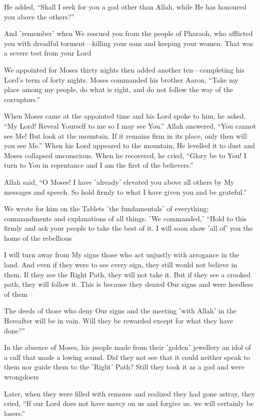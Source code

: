 He added, “Shall I seek for you a god other than Allah, while He has honoured you above the others?”

And ˹remember˺ when We rescued you from the people of Pharaoh, who afflicted you with dreadful torment—killing your sons and keeping your women. That was a severe test from your Lord

We appointed for Moses thirty nights then added another ten—completing his Lord’s term of forty nights. Moses commanded his brother Aaron, “Take my place among my people, do what is right, and do not follow the way of the corruptors.”

When Moses came at the appointed time and his Lord spoke to him, he asked, “My Lord! Reveal Yourself to me so I may see You.” Allah answered, “You cannot see Me! But look at the mountain. If it remains firm in its place, only then will you see Me.” When his Lord appeared to the mountain, He levelled it to dust and Moses collapsed unconscious. When he recovered, he cried, “Glory be to You! I turn to You in repentance and I am the first of the believers.”

Allah said, “O Moses! I have ˹already˺ elevated you above all others by My messages and speech. So hold firmly to what I have given you and be grateful.”

We wrote for him on the Tablets ˹the fundamentals˺ of everything; commandments and explanations of all things. ˹We commanded,˺ “Hold to this firmly and ask your people to take the best of it. I will soon show ˹all of˺ you the home of the rebellious

I will turn away from My signs those who act unjustly with arrogance in the land. And even if they were to see every sign, they still would not believe in them. If they see the Right Path, they will not take it. But if they see a crooked path, they will follow it. This is because they denied Our signs and were heedless of them

The deeds of those who deny Our signs and the meeting ˹with Allah˺ in the Hereafter will be in vain. Will they be rewarded except for what they have done?”

In the absence of Moses, his people made from their ˹golden˺ jewellery an idol of a calf that made a lowing sound. Did they not see that it could neither speak to them nor guide them to the ˹Right˺ Path? Still they took it as a god and were wrongdoers

Later, when they were filled with remorse and realized they had gone astray, they cried, “If our Lord does not have mercy on us and forgive us, we will certainly be losers.”

